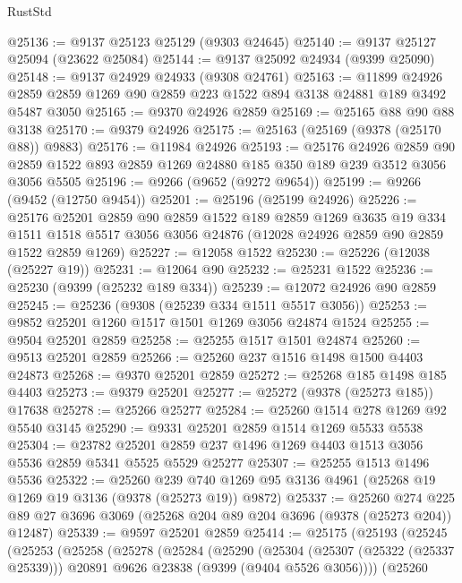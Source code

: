 \begin{lexlean}{RustStd}
\begin{coremodule}
@25136 := @9137 @25123 @25129 (@9303 @24645)
@25140 := @9137 @25127 @25094 (@23622 @25084)
@25144 := @9137 @25092 @24934 (@9399 @25090)
@25148 := @9137 @24929 @24933 (@9308 @24761)
@25163 := @11899
    @24926
    @2859
    @2859
    @1269
    @90
    @2859
    @223
    @1522
    @894
    @3138
    @24881
    @189
    @3492
    @5487
    @3050
@25165 := @9370 @24926 @2859
@25169 := @25165 @88 @90 @88 @3138
@25170 := @9379 @24926
@25175 := @25163 (@25169 (@9378 (@25170 @88)) @9883)
@25176 := @11984 @24926
@25193 := @25176
    @24926
    @2859
    @90
    @2859
    @1522
    @893
    @2859
    @1269
    @24880
    @185
    @350
    @189
    @239
    @3512
    @3056
    @3056
    @5505
@25196 := @9266 (@9652 (@9272 @9654))
@25199 := @9266 (@9452 (@12750 @9454))
@25201 := @25196 (@25199 @24926)
@25226 := @25176
    @25201
    @2859
    @90
    @2859
    @1522
    @189
    @2859
    @1269
    @3635
    @19
    @334
    @1511
    @1518
    @5517
    @3056
    @3056
    @24876
    (@12028 @24926 @2859 @90 @2859 @1522 @2859 @1269)
@25227 := @12058 @1522
@25230 := @25226 (@12038 (@25227 @19))
@25231 := @12064 @90
@25232 := @25231 @1522
@25236 := @25230 (@9399 (@25232 @189 @334))
@25239 := @12072 @24926 @90 @2859
@25245 := @25236 (@9308 (@25239 @334 @1511 @5517 @3056))
@25253 := @9852 @25201 @1260 @1517 @1501 @1269 @3056 @24874 @1524
@25255 := @9504 @25201 @2859
@25258 := @25255 @1517 @1501 @24874
@25260 := @9513 @25201 @2859
@25266 := @25260 @237 @1516 @1498 @1500 @4403 @24873
@25268 := @9370 @25201 @2859
@25272 := @25268 @185 @1498 @185 @4403
@25273 := @9379 @25201
@25277 := @25272 (@9378 (@25273 @185)) @17638
@25278 := @25266 @25277
@25284 := @25260 @1514 @278 @1269 @92 @5540 @3145
@25290 := @9331 @25201 @2859 @1514 @1269 @5533 @5538
@25304 := @23782
    @25201
    @2859
    @237
    @1496
    @1269
    @4403
    @1513
    @3056
    @5536
    @2859
    @5341
    @5525
    @5529
    @25277
@25307 := @25255 @1513 @1496 @5536
@25322 := @25260
    @239
    @740
    @1269
    @95
    @3136
    @4961
    (@25268 @19 @1269 @19 @3136 (@9378 (@25273 @19)) @9872)
@25337 := @25260
    @274
    @225
    @89
    @27
    @3696
    @3069
    (@25268 @204 @89 @204 @3696 (@9378 (@25273 @204)) @12487)
@25339 := @9597 @25201 @2859
@25414 := @25175
    (@25193
      (@25245
        (@25253
          (@25258
            (@25278
              (@25284
                (@25290
                  (@25304
                    (@25307 (@25322 (@25337 @25339)))
                    @20891
                    @9626
                    @23838
                    (@9399 (@9404 @5526 @3056))))
                (@25260

\end{coremodule}
\end{lexlean}
